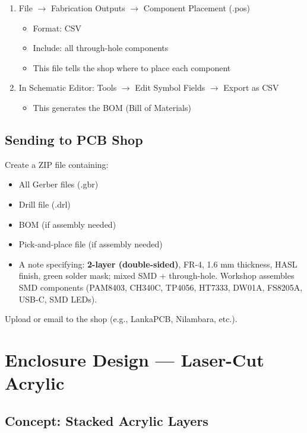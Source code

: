 \documentclass[a4paper,11pt]{article}
\renewcommand*{\,}{ }%
\begin{document}
\begin{enumerate}
    \item File $\rightarrow$ Fabrication Outputs $\rightarrow$ Component Placement (.pos)
    \begin{itemize}[noitemsep]
        \item Format: CSV
        \item Include: all through-hole components
        \item This file tells the shop where to place each component
    \end{itemize}
    \item In Schematic Editor: Tools $\rightarrow$ Edit Symbol Fields $\rightarrow$ Export as CSV
    \begin{itemize}[noitemsep]
        \item This generates the BOM (Bill of Materials)
    \end{itemize}
\end{enumerate}

\subsection{Sending to PCB Shop}

Create a ZIP file containing:
\begin{itemize}[noitemsep]
    \item All Gerber files (.gbr)
    \item Drill file (.drl)
    \item BOM (if assembly needed)
    \item Pick-and-place file (if assembly needed)
    \item A note specifying: \textbf{2-layer (double-sided)}, FR-4, 1.6\,mm thickness, HASL finish, green solder mask; mixed SMD + through-hole. Workshop assembles SMD components (PAM8403, CH340C, TP4056, HT7333, DW01A, FS8205A, USB-C, SMD LEDs).
\end{itemize}

Upload or email to the shop (e.g., LankaPCB, Nilambara, etc.).

\section{Enclosure Design --- Laser-Cut Acrylic}
\label{sec:enclosure}

\subsection{Concept: Stacked Acrylic Layers}
\end{document}
